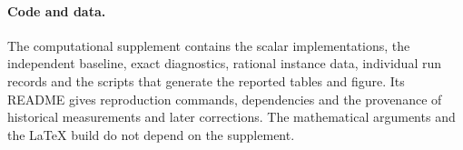 \paragraph{Code and data.}
The computational supplement contains the scalar implementations, the
independent baseline, exact diagnostics, rational instance data, individual
run records and the scripts that generate the reported tables and figure.
Its README gives reproduction commands, dependencies and the provenance of
historical measurements and later corrections. The mathematical arguments
and the LaTeX build do not depend on the supplement.

